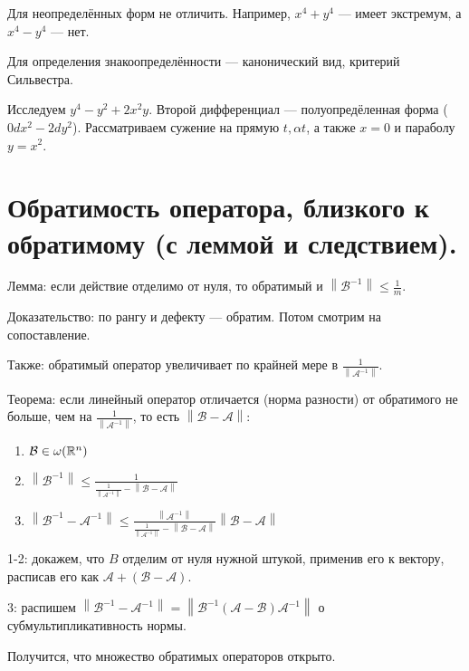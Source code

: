 \documentclass[12pt, a4paper]{article}
\begin{document}
    Для неопределённых форм не отличить. Например, $x^4 + y^4$ — имеет экстремум, а $x^4 - y^4$ — нет.

    Для определения знакоопределённости — канонический вид, критерий Сильвестра.

    Исследуем $y^4 - y^2 + 2x^2 y$. Второй дифференциал — полуопредёленная форма ($0 dx^2 -2 dy^2$). 
    Рассматриваем сужение на прямую $t, \alpha t$, а также $x = 0$ и параболу $y = x^2$.

\section{Обратимость оператора, близкого к обратимому (с леммой и следствием).}

    Лемма: если действие отделимо от нуля, то обратимый и $\left\| \mathcal{B}^{-1} \right\| \leqslant \frac{1}{m}$.

    Доказательство: по рангу и дефекту — обратим. Потом смотрим на сопоставление.

    Также: обратимый оператор увеличивает по крайней мере в $\frac{1}{\left\| \mathcal{A^{-1}} \right\|}$.

    Теорема: если линейный оператор отличается (норма разности) от обратимого не больше, 
    чем на $\frac{1}{\left\| \mathcal{A^{-1}} \right\|}$, то есть $\left\| \mathcal{B - A} \right\|$:

    \begin{enumerate}
        \item $\mathcal{B} \in \omega({\mathbb{R}}^{n})$
        \item $\left\| \mathcal{B}^{-1} \right\| \leqslant \frac{1}{\frac{1}{\left\| \mathcal{A}^{-1} \right\|} - \left\| \mathcal{B - A} \right\|}$
        \item $\left\| \mathcal{B}^{-1} - \mathcal{A}^{-1} \right\| \leqslant \frac{\left\| \mathcal{A}^{-1} \right\|}{\frac{1}{\left\| \mathcal{A}^{-1} \right\|} - \left\| \mathcal{B - A} \right\|} \left\| \mathcal{B - A} \right\|$
    \end{enumerate}

    1-2: докажем, что $B$ отделим от нуля нужной штукой, применив его к вектору, расписав его как $\mathcal{A + (B - A)}$. 

    3: распишем $\left\| \mathcal{B}^{-1} - \mathcal{A}^{-1} \right\| = \left\| \mathcal{B}^{-1}(\mathcal{A - B})\mathcal{A}^{-1} \right\|$ о субмультипликативность нормы.

    Получится, что множество обратимых операторов открыто.
\end{document}
